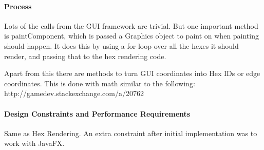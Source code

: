 \documentclass[12pt,a4paper,titlepage]{article}
\begin{document}
\paragraph{Process}
Lots of the calls from the GUI framework are trivial. But one important 
method is paintComponent, which is passed a Graphics object to paint on when
painting should happen. It does this by using a for loop over all the hexes
it should render, and passing that to the hex rendering code.

Apart from this there are methods to turn GUI coordinates into Hex IDs or 
edge coordinates. This is done with math similar to the following:
http://gamedev.stackexchange.com/a/20762
\paragraph{Design Constraints and Performance Requirements}
Same as Hex Rendering. An extra constraint after initial implementation was to
work with JavaFX.
\end{document}
